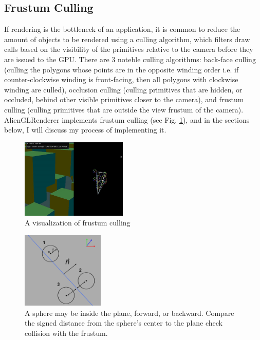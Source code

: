 \documentclass[letterpaper, 10 pt, conference]{ieeeconf}  %
\begin{document}
\subsection {Frustum Culling}
If rendering is the bottleneck of an application, it is common to reduce the amount of objects to be rendered using a culling algorithm, which filters draw calls based on the visibility of the primitives relative to the camera before they are issued to the GPU. There are 3 noteble culling algorithms: back-face culling (culling the polygons whose points are in the opposite winding order i.e. if counter-clockwise winding is front-facing, then all polygons with clockwise winding are culled), occlusion culling (culling primitives that are hidden, or occluded, behind other visible primitives closer to the camera), and frustum culling (culling primitives that are outside the view frustum of the camera). AlienGLRenderer implements frustum culling (see Fig. \ref{fig:cull}), and in the sections below, I will discuss my process of implementing it.

\begin{figure}
        \centering
        \includegraphics[width=0.45\textwidth]{frustum_cull.png}
        \caption{A visualization of frustum culling} \label{fig:cull}
\end{figure}

\begin{figure}
        \centering
        \includegraphics[width=0.35\textwidth]{sphere_detect.png}
        \caption{A sphere may be inside the plane, forward, or backward. Compare the signed distance from the sphere's center to the plane check collision with the frustum. } \label{fig:sphere}
\end{figure}
\end{document}
